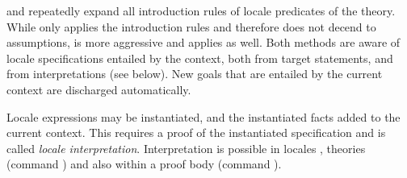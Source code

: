 \begin{isabellebody}
\begin{isamarkuptext}
\begin{description}
  \item \hyperlink{method.intro-locales}{\mbox{}} and \hyperlink{method.unfold-locales}{\mbox{}}
  repeatedly expand all introduction rules of locale predicates of the
  theory.  While \hyperlink{method.intro-locales}{\mbox{}} only applies the  introduction rules and therefore does not decend to
  assumptions, \hyperlink{method.unfold-locales}{\mbox{}} is more aggressive and applies
   as well.  Both methods are aware of locale
  specifications entailed by the context, both from target statements,
  and from interpretations (see below).  New goals that are entailed
  by the current context are discharged automatically.

  \end{description}%
\end{isamarkuptext}%
\isamarkuptrue%
%
\isamarkuptrue%
%
\begin{isamarkuptext}%
Locale expressions may be instantiated, and the instantiated facts
  added to the current context.  This requires a proof of the
  instantiated specification and is called \emph{locale
  interpretation}.  Interpretation is possible in locales \hyperlink{command.sublocale}{\mbox{}}, theories (command \hyperlink{command.interpretation}{\mbox{}}) and
  also within a proof body (command \hyperlink{command.interpret}{\mbox{}}).


\end{isamarkuptext}
\end{isabellebody}
